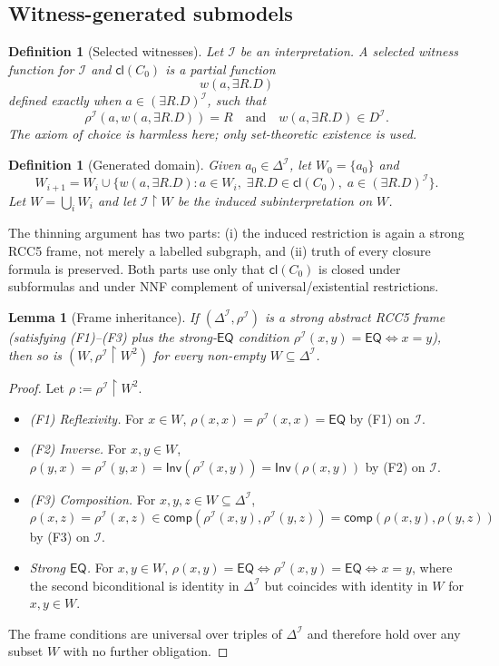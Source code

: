 \documentclass[11pt]{article}
\newtheorem{lemma}[theorem]{Lemma}
\newtheorem{definition}[theorem]{Definition}
\newcommand{\EQ}{\mathsf{EQ}}
\newcommand{\comp}{\mathsf{comp}}
\newcommand{\Cl}{\mathsf{cl}}
\newcommand{\I}{\mathcal I}
\begin{document}
\subsection{Witness-generated submodels}

\begin{definition}[Selected witnesses]
Let $\I$ be an interpretation.  A selected witness function for $\I$ and $\Cl(C_0)$ is a partial function
\[
  w(a,\exists R.D)
\]
defined exactly when $a\in(\exists R.D)^\I$, such that
\[
  \rho^\I(a,w(a,\exists R.D))=R
  \quad\text{and}\quad
  w(a,\exists R.D)\in D^\I.
\]
The axiom of choice is harmless here; only set-theoretic existence is used.
\end{definition}

\begin{definition}[Generated domain]
Given $a_0\in\Delta^\I$, let $W_0=\{a_0\}$ and
\[
  W_{i+1}=W_i\cup\{w(a,\exists R.D):a\in W_i,\; \exists R.D\in\Cl(C_0),\; a\in(\exists R.D)^\I\}.
\]
Let $W=\bigcup_i W_i$ and let $\I\upharpoonright W$ be the induced subinterpretation on $W$.
\end{definition}

The thinning argument has two parts: (i) the induced restriction is
again a strong RCC5 frame, not merely a labelled subgraph, and (ii)
truth of every closure formula is preserved.  Both parts use only
that $\Cl(C_0)$ is closed under subformulas and under NNF complement
of universal/existential restrictions.

\begin{lemma}[Frame inheritance]\label{lem:frame-inherited}
If $(\Delta^\I,\rho^\I)$ is a strong abstract RCC5 frame (satisfying
(F1)--(F3) plus the strong-$\EQ$ condition
$\rho^\I(x,y)=\EQ\iff x=y$), then so is
$(W,\rho^\I\!\upharpoonright\!W^2)$ for every non-empty
$W\subseteq\Delta^\I$.
\end{lemma}

\begin{proof}
Let $\rho:=\rho^\I\!\upharpoonright\!W^2$.
\begin{itemize}[leftmargin=2em]
  \item \emph{(F1) Reflexivity.}  For $x\in W$,
    $\rho(x,x)=\rho^\I(x,x)=\EQ$ by (F1) on $\I$.
  \item \emph{(F2) Inverse.}  For $x,y\in W$,
    $\rho(y,x)=\rho^\I(y,x)=\mathsf{Inv}(\rho^\I(x,y))=\mathsf{Inv}(\rho(x,y))$
    by (F2) on $\I$.
  \item \emph{(F3) Composition.}  For $x,y,z\in W\subseteq\Delta^\I$,
    $\rho(x,z)=\rho^\I(x,z)\in\comp(\rho^\I(x,y),\rho^\I(y,z))=\comp(\rho(x,y),\rho(y,z))$
    by (F3) on $\I$.
  \item \emph{Strong $\EQ$.}  For $x,y\in W$,
    $\rho(x,y)=\EQ\iff\rho^\I(x,y)=\EQ\iff x=y$, where the second
    biconditional is identity in $\Delta^\I$ but coincides with
    identity in $W$ for $x,y\in W$.
\end{itemize}
The frame conditions are universal over triples of $\Delta^\I$ and
therefore hold over any subset $W$ with no further obligation.
\end{proof}
\end{document}
